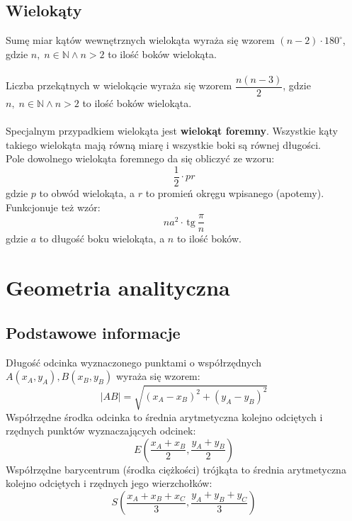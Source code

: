 \documentclass[14pt,a4paper]{extarticle}
\newcommand{\tg}{\,\text{tg}\:}
\begin{document}
\subsection{Wielokąty}
\noindent Sumę miar kątów wewnętrznych wielokąta wyraża się wzorem $(n - 2)\cdot 180^{\circ}$, gdzie $n,\; n\in \mathbb{N} \land n > 2$
to ilość boków wielokąta.\\\\
\noindent Liczba przekątnych w wielokącie wyraża się wzorem $\dfrac{n(n-3)}{2}$, gdzie $n,\; n\in \mathbb{N} \land n > 2$
to ilość boków wielokąta.\\\\
Specjalnym przypadkiem wielokąta jest \textbf{wielokąt foremny}. Wszystkie kąty takiego wielokąta mają
równą miarę i wszystkie boki są równej długości.\\
Pole dowolnego wielokąta foremnego da się obliczyć ze wzoru:
$$\dfrac{1}{2}\cdot pr$$
gdzie $p$ to obwód wielokąta, a $r$ to promień okręgu wpisanego (apotemy).\\ Funkcjonuje też wzór:
$$na^{2}\cdot\tg\frac{\pi}{n}$$
gdzie $a$ to długość boku wielokąta, a $n$ to ilość boków.

\newpage
\section{Geometria analityczna}

\subsection{Podstawowe informacje}
\MoveBelowBox
{}
\hfill\break
\noindent Długość odcinka wyznaczonego punktami o współrzędnych $A(x_{A}, y_{A}), B(x_{B}, y_{B})$
wyraża się wzorem:
$$\vert AB\vert = \sqrt{(x_{A} - x_{B})^{2}+(y_{A}-y_{B})^{2}}$$
\MoveBelowBox
\noindent Współrzędne środka odcinka to średnia arytmetyczna kolejno odciętych i rzędnych punktów wyznaczających odcinek:
$$E\left(\dfrac{x_{A}+x_{B}}{2}, \dfrac{y_{A}+y_{B}}{2}\right)$$
\noindent Współrzędne barycentrum (środka ciężkości) trójkąta to średnia arytmetyczna kolejno odciętych i
rzędnych jego wierzchołków:
$$S\left(\dfrac{x_{A}+x_{B}+x_{C}}{3}, \dfrac{y_{A}+y_{B}+y_{C}}{3}\right)$$
\end{document}
